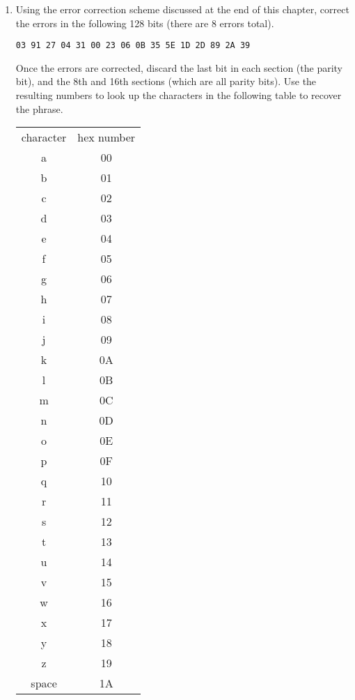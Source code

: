 \begin{enumerate}
	\item Using the error correction scheme discussed at the end of this chapter, correct the errors in the following 128 bits (there are 8 errors total).\\
	
	\begin{center}\texttt{03 91 27 04 31 00 23 06 0B 35 5E 1D 2D 89 2A 39}\end{center}
	
	Once the errors are corrected, discard the last bit in each section (the parity bit), and the 8th and 16th sections (which are all parity bits). Use the resulting numbers to look up the characters in the following table to recover the phrase.
	
	\begin{center}
		\begin{tabular}{c | c }
			character & hex number \\
			a & 00 \\
			b & 01 \\
			c & 02 \\
			d & 03 \\
			e & 04 \\
			f & 05 \\
			g & 06 \\
			h & 07 \\
			i & 08 \\
			j & 09 \\
			k & 0A \\
			l & 0B \\
			m & 0C \\
			n & 0D \\
			o & 0E \\
			p & 0F \\
			q & 10 \\
			r & 11 \\
			s & 12 \\
			t & 13 \\
			u & 14 \\
			v & 15 \\
			w & 16 \\
			x & 17 \\
			y & 18 \\
			z & 19 \\
			space & 1A \\
		\end{tabular}
	\end{center}
\end{enumerate}